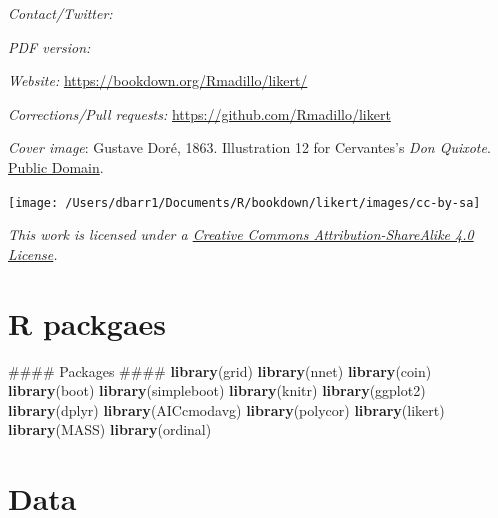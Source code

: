 \documentclass[]{book}
\newenvironment{Shaded}{\begin{snugshade}}{\end{snugshade}}
\newcommand{\KeywordTok}[1]{\textcolor[rgb]{0.13,0.29,0.53}{\textbf{{#1}}}}
\newcommand{\NormalTok}[1]{{#1}}
\begin{document}
\emph{Contact/Twitter:} \citet{healthstatsdude}

\emph{PDF version:}

\emph{Website:} \url{https://bookdown.org/Rmadillo/likert/}

\emph{Corrections/Pull requests:}
\url{https://github.com/Rmadillo/likert}

\emph{Cover image}: Gustave Doré, 1863. Illustration 12 for Cervantes's
\emph{Don Quixote}.
\href{https://commons.wikimedia.org/w/index.php?curid=677913}{Public
Domain}.

\texttt{[image: /Users/dbarr1/Documents/R/bookdown/likert/images/cc-by-sa]}

\emph{This work is licensed under a
\href{https://creativecommons.org/licenses/by-sa/4.0/}{Creative Commons
Attribution-ShareAlike 4.0 License}.}

\section{R packgaes}\label{r-packgaes}

\begin{Shaded}
\begin{Highlighting}[]
\NormalTok{#### Packages ####}
\KeywordTok{library}\NormalTok{(grid)}
\KeywordTok{library}\NormalTok{(nnet)}
\KeywordTok{library}\NormalTok{(coin)}
\KeywordTok{library}\NormalTok{(boot)}
\KeywordTok{library}\NormalTok{(simpleboot)}
\KeywordTok{library}\NormalTok{(knitr)}
\KeywordTok{library}\NormalTok{(ggplot2)}
\KeywordTok{library}\NormalTok{(dplyr)}
\KeywordTok{library}\NormalTok{(AICcmodavg)}
\KeywordTok{library}\NormalTok{(polycor)}
\KeywordTok{library}\NormalTok{(likert)}
\KeywordTok{library}\NormalTok{(MASS)}
\KeywordTok{library}\NormalTok{(ordinal)}
\end{Highlighting}
\end{Shaded}

\section{Data}\label{data}
\end{document}

